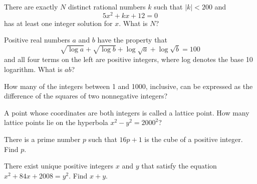 \documentclass[mast]{lucky}
\begin{document}
\begin{prob}[AMC 12A 2014/19]{6}
There are exactly $N$ distinct rational numbers $k$ such that $|k|<200$ and\[5x^2+kx+12=0\]has at least one integer solution for $x$. What is $N$?
\end{prob}

\begin{prob}[AMC 12A 2019/15]{6}
Positive real numbers $a$ and $b$ have the property that\[\sqrt{\log{a}} + \sqrt{\log{b}} + \log \sqrt{a} + \log \sqrt{b} = 100\]and all four terms on the left are positive integers, where log denotes the base 10 logarithm. What is $ab$?
\end{prob}

\begin{prob}[AIME 1997/1]{6}
How many of the integers between 1 and 1000, inclusive, can be expressed as the difference of the squares of two nonnegative integers?
\end{prob}

\begin{prob}[AIME II 2000/2]{9}
A point whose coordinates are both integers is called a lattice point. How many lattice points lie on the hyperbola $x^2 -y^2 = 2000^2$?
\end{prob}

\begin{prob}[AIME I 2015/3]{9}
There is a prime number $p$ such that $16p+1$ is the cube of a positive integer. Find $p$.
\end{prob}

\begin{prob}[AIME I 2008/4]{9}
There exist unique positive integers $x$ and $y$ that satisfy the equation $x^2 + 84x + 2008 = y^2$. Find $x + y$.
\end{prob}
\end{document}
